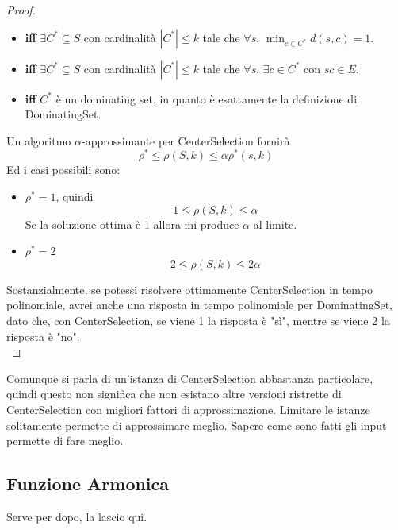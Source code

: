 \begin{proof}
\begin{itemize}[label*=]
		\item \textbf{iff} $\exists C^\ast \subseteq S$ con cardinalità $|C^\ast| \leq k$ tale che $\forall s$, $\min_{c \in C^\ast} d(s,c) = 1$.\\
		
		\item \textbf{iff} $\exists C^\ast \subseteq S$ con cardinalità $|C^\ast| \leq k$ tale che $\forall s$,  $\exists c \in C^\ast$ con $sc \in E$.\\
		
		\item \textbf{iff} $C^\ast$ è un dominating set, in quanto è esattamente la definizione di DominatingSet.\\
	\end{itemize}
	
	Un algoritmo $\alpha$-approssimante per CenterSelection fornirà
	$$ \rho^\ast \leq \rho (S,k) \leq \alpha \rho^\ast (s,k) $$
	Ed i casi possibili sono:
	\begin{itemize}
		\item $\rho^\ast = 1$, quindi
		$$ 1 \leq \rho(S,k) \leq \alpha $$
		Se la soluzione ottima è 1 allora mi produce $\alpha$ al limite.\\
		
		\item $\rho^\ast = 2$
		$$ 2 \leq \rho(S,k) \leq 2 \alpha $$
	\end{itemize}
	Sostanzialmente, se potessi risolvere ottimamente CenterSelection in tempo polinomiale, avrei anche una risposta in tempo polinomiale per DominatingSet, dato che, con CenterSelection, se viene 1 la risposta è "sì", mentre se viene 2 la risposta è "no".\\
\end{proof}

Comunque si parla di un'istanza di CenterSelection abbastanza particolare, quindi questo non significa che non esistano altre versioni ristrette di CenterSelection con migliori fattori di approssimazione. Limitare le istanze solitamente permette di approssimare meglio. Sapere come sono fatti gli input permette di fare meglio.\\

\newpage

\subsection*{Funzione Armonica}
Serve per dopo, la lascio qui.\\

